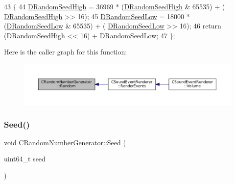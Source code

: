 \begin{DoxyCode}
43                          \{
44             \hyperlink{classCRandomNumberGenerator_a450670f954d6ccb3cc39d7eebbf889c6}{DRandomSeedHigh} = 36969 * (\hyperlink{classCRandomNumberGenerator_a450670f954d6ccb3cc39d7eebbf889c6}{DRandomSeedHigh} & 65535) + (
      \hyperlink{classCRandomNumberGenerator_a450670f954d6ccb3cc39d7eebbf889c6}{DRandomSeedHigh} >> 16);
45             \hyperlink{classCRandomNumberGenerator_a33bf3bb9bc1378f4142932a01a3e2cfd}{DRandomSeedLow} = 18000 * (\hyperlink{classCRandomNumberGenerator_a33bf3bb9bc1378f4142932a01a3e2cfd}{DRandomSeedLow} & 65535) + (
      \hyperlink{classCRandomNumberGenerator_a33bf3bb9bc1378f4142932a01a3e2cfd}{DRandomSeedLow} >> 16);
46             \textcolor{keywordflow}{return} (\hyperlink{classCRandomNumberGenerator_a450670f954d6ccb3cc39d7eebbf889c6}{DRandomSeedHigh} << 16) + \hyperlink{classCRandomNumberGenerator_a33bf3bb9bc1378f4142932a01a3e2cfd}{DRandomSeedLow};
47         \};
\end{DoxyCode}
Here is the caller graph for this function\+:
\nopagebreak
\begin{figure}[H]
\begin{center}
\leavevmode
\includegraphics[width=350pt]{classCRandomNumberGenerator_aa7fc51bde5647d15df2f1b9826702ca2_icgraph}
\end{center}
\end{figure}
\hypertarget{classCRandomNumberGenerator_a9b6f52335ea93f1aaec4521c66806f39}{}\label{classCRandomNumberGenerator_a9b6f52335ea93f1aaec4521c66806f39} 
\subsubsection{\texorpdfstring{Seed()}{Seed()}\hspace{0.1cm}{\footnotesize\ttfamily [1/2]}}
{\footnotesize\ttfamily void C\+Random\+Number\+Generator\+::\+Seed (\begin{DoxyParamCaption}\item[{uint64\+\_\+t}]{seed }\end{DoxyParamCaption})\hspace{0.3cm}{\ttfamily [inline]}}



